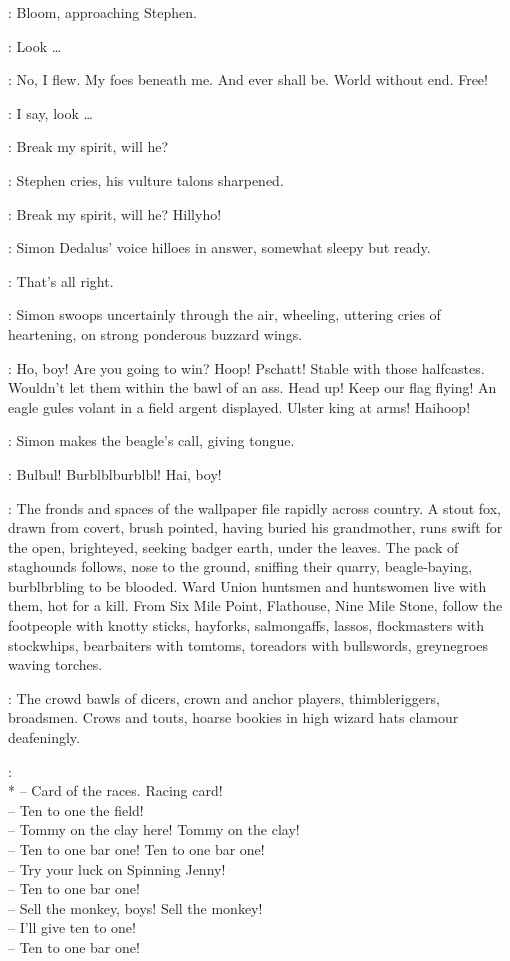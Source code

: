 :
Bloom, approaching Stephen.

\Bloom:
Look \ldots

\Stephen:
No, I flew.
My foes beneath me.
And ever shall be.
World without end.
Free!

\Bloom:
I say, look \ldots

\Stephen:
Break my spirit, will he?

:
Stephen cries, his vulture talons sharpened.

\Stephen:
Break my spirit, will he?
Hillyho!

:
Simon Dedalus' voice hilloes in answer, somewhat sleepy but ready.

\Simon:
That's all right.

:
Simon swoops uncertainly through the air,
wheeling, uttering cries of heartening, on strong ponderous buzzard wings.

\Simon:
Ho, boy!
Are you going to win?
Hoop!
Pschatt!
Stable with those halfcastes.
Wouldn't let them within the bawl of an ass.
Head up!
Keep our flag flying!
An eagle gules volant in a field argent displayed.
Ulster king at arms!
Haihoop!

:
Simon makes the beagle's call, giving tongue.

\Simon:
Bulbul!
Burblblburblbl!
Hai, boy!

:
The fronds and spaces of the wallpaper file rapidly across country.
A stout fox, drawn from covert, brush pointed, having buried his grandmother,
runs swift for the open, brighteyed, seeking badger earth, under the leaves.
The pack of staghounds follows, nose to the ground,
sniffing their quarry, beagle-baying, burblbrbling to be blooded.
Ward Union huntsmen and huntswomen live with them, hot for a kill.
From Six Mile Point, Flathouse, Nine Mile Stone, follow the footpeople with knotty sticks,
hayforks, salmongaffs, lassos, flockmasters with stockwhips,
bearbaiters with tomtoms, toreadors with bullswords, greynegroes waving torches.

:
The crowd bawls of dicers, crown and anchor players, thimbleriggers, broadsmen.
Crows and touts, hoarse bookies in high wizard hats clamour deafeningly.

\Crowd:\\*
-- Card of the races. Racing card!\\
-- Ten to one the field!\\
-- Tommy on the clay here! Tommy on the clay!\\
-- Ten to one bar one! Ten to one bar one!\\
-- Try your luck on Spinning Jenny!\\
-- Ten to one bar one!%
\\
-- Sell the monkey, boys! Sell the monkey!\\
-- I'll give ten to one!\\
-- Ten to one bar one!

